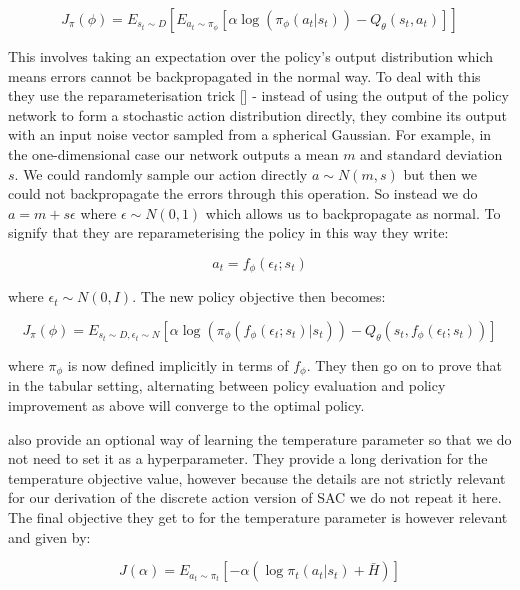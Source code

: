 \documentclass{article}
\begin{document}
\begin{equation}
J_{\pi}(\phi) = E_{s_t \sim D}[E_{a_t \sim \pi_{\phi}}[\alpha \log(\pi_{\phi}(a_t|s_t)) - Q_{\theta}(s_t, a_t)]]
\label{eq:policy_objective_before_reparam}
\end{equation}

This involves taking an expectation over the policy's output distribution which means errors cannot be backpropagated in the normal way. To deal with this they use the reparameterisation trick [\cite{reparatrick}] - instead of using the output of the policy network to form a stochastic action distribution directly, they combine its output with an input noise vector sampled from a spherical Gaussian. For example, in the one-dimensional case our network outputs a mean $m$ and standard deviation $s$. We could randomly sample our action directly $ a \sim N(m, s)$ but then we could not backpropagate the errors through this operation. So instead we do $a = m + s \epsilon $ where $\epsilon \sim N(0, 1)$ which allows us to backpropagate as normal. To signify that they are reparameterising the policy in this way they write:

\begin{equation}
a_t = f_{\phi}(\epsilon_t; s_t)
\label{eq:reparam}
\end{equation}

where $\epsilon_t \sim N(0, I)$. The new policy objective then becomes:

\begin{equation}
J_{\pi}(\phi) = E_{s_t \sim D, \epsilon_t \sim N}[\alpha \log(\pi_{\phi}(f_{\phi}(\epsilon_t; s_t)|s_t)) - Q_{\theta}(s_t, f_{\phi}(\epsilon_t; s_t))]
\label{eq:policy_objective_after_reparam}
\end{equation}

where $\pi_{\phi}$ is now defined implicitly in terms of $f_{\phi}$. They then go on to prove that in the tabular setting, alternating between policy evaluation and policy improvement as above will converge to the optimal policy. 

\citet{SACapplications} also provide an optional way of learning the temperature parameter so that we do not need to set it as a hyperparameter. They provide a long derivation for the temperature objective value, however because the details are not strictly relevant for our derivation of the discrete action version of SAC we do not repeat it here. The final objective they get to for the temperature parameter is however relevant and given by:

\begin{equation}
J(\alpha) = E_{a_t \sim \pi_t}[-\alpha (\log \pi_t(a_t|s_t) + \bar{H})]
\label{eq:temperature_objective}
\end{equation}
\end{document}
